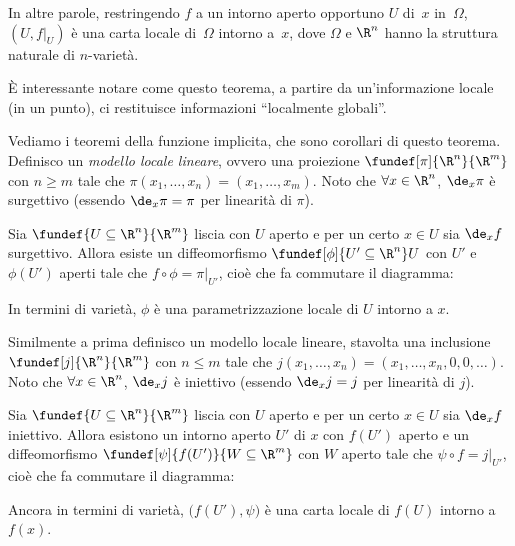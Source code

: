 In altre parole,
restringendo $f$ a un intorno aperto opportuno $U$ di~$x$ in~$\Omega$,
$(U,f|_U)$ è una carta locale di~$\Omega$ intorno a~$x$,
dove $\Omega$ e $\R^n$ hanno la struttura naturale di $n$-varietà.

È interessante notare come questo teorema,
a partire da un'informazione locale (in un punto),
ci restituisce informazioni ``localmente globali''.

Vediamo i teoremi della funzione implicita,
che sono corollari di questo teorema.
Definisco un \emph{modello locale lineare},
ovvero una proiezione $\fundef[\pi]{\R^n}{\R^m}$ con $n \ge m$
tale che $\pi(x_1,\dots,x_n)=(x_1,\dots,x_m)$.
Noto che $\forall x \in \R^n$, $\de_x\pi$ è surgettivo
(essendo $\de_x\pi=\pi$ per linearità di $\pi$).

\begin{fat}
	\label{th:funimpsurg}
	Sia $\fundef{U\subseteq\R^n}{\R^m}$ liscia con $U$ aperto
	e per un certo $x\in U$ sia $\de_xf$ surgettivo.
	Allora esiste un diffeomorfismo $\fundef[\phi]{U'\subseteq\R^n}U$
	con $U'$ e $\phi(U')$ aperti
	tale che $f\circ\phi=\pi|_{U'}$, cioè che fa commutare il diagramma:
	\begin{center}
		
	\end{center}
\end{fat}

In termini di varietà, $\phi$ è una parametrizzazione locale di $U$ intorno a $x$.

Similmente a prima definisco un modello locale lineare,
stavolta una inclusione $\fundef[j]{\R^n}{\R^m}$ con $n \le m$
tale che $j(x_1,\dots,x_n)=(x_1,\dots,x_n,0,0,\dots)$.
Noto che $\forall x \in \R^n$, $\de_xj$ è iniettivo
(essendo $\de_xj=j$ per linearità di $j$).

\begin{fat}
	Sia $\fundef{U\subseteq\R^n}{\R^m}$ liscia con $U$ aperto
	e per un certo $x\in U$ sia $\de_xf$ iniettivo.
	Allora esistono un intorno aperto $U'$ di $x$ con $f(U')$ aperto
	e un diffeomorfismo $\fundef[\psi]{f(U')}{W\subseteq\R^m}$ con $W$ aperto
	tale che $\psi\circ f=j|_{U'}$, cioè che fa commutare il diagramma:
	\begin{center}
		
	\end{center}
\end{fat}

Ancora in termini di varietà, $\big(f(U'),\psi\big)$ è una carta locale di $f(U)$ intorno a~$f(x)$.

